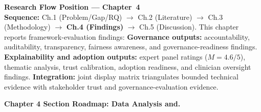 \medskip\noindent
\small\textbf{Research Flow Position --- Chapter~4}\\[3pt]
\textbf{Sequence:} Ch.1 (Problem/Gap/RQ) $\to$ Ch.2 (Literature) $\to$ Ch.3 (Methodology) $\to$ \textbf{Ch.4 (Findings)} $\to$ Ch.5 (Discussion).
This chapter reports framework-evaluation findings:
\textbf{Governance outputs:} accountability, auditability, transparency, fairness awareness, and governance-readiness findings.
\textbf{Explainability and adoption outputs:} expert panel ratings ($M=4.6/5$), thematic analysis, trust calibration, adoption readiness, and clinician oversight findings.
\textbf{Integration:} joint display matrix triangulates bounded technical evidence with stakeholder trust and governance-evaluation evidence.

\vspace{0.5em}


\noindent\textbf{Chapter 4 Section Roadmap: Data Analysis and.}

